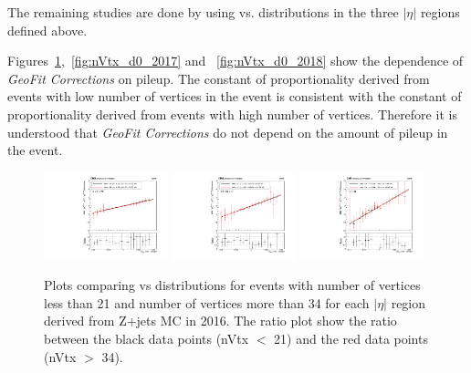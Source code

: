 The remaining studies are done by using \dptoverptsquare vs. \dzeroBS distributions in the three $|\eta|$ regions defined above.

Figures~\ref{fig:nVtx_d0_2016},~\ref{fig:nVtx_d0_2017} and ~\ref{fig:nVtx_d0_2018} show the dependence of \textit{GeoFit Corrections} on pileup. The constant of proportionality derived from events with low number of vertices in the event is consistent with the constant of proportionality derived from events with high number of vertices. Therefore it is understood that \textit{GeoFit Corrections} do not depend on the amount of pileup in the event.

\begin{figure}[h!]
    \centering
    \includegraphics[width=0.32\textwidth]{images_geofit/nVtx_eta_0_0p9_2016.pdf}
    \includegraphics[width=0.32\textwidth]{images_geofit/nVtx_eta_0p9_1p7_2016.pdf}
    \includegraphics[width=0.32\textwidth]{images_geofit/nVtx_eta_1p7_inf_2016.pdf}
    \caption{Plots comparing \dptoverptsquare vs \dzeroBS distributions for events with number of vertices less than 21 and number of vertices more than 34 for each $|\eta|$ region derived from Z+jets MC in 2016. The ratio plot show the ratio between the black data points (nVtx $<$ 21) and the red data points (nVtx $>$ 34).}
    \label{fig:nVtx_d0_2016}
\end{figure}

